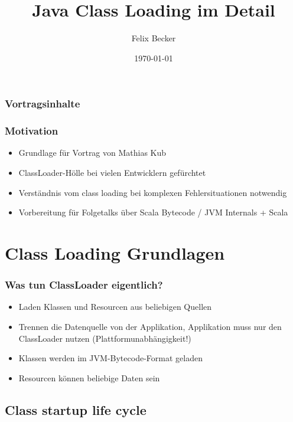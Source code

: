 \documentclass[aspectratio=169]{beamer}
\title{Java Class Loading im Detail}
\author{Felix Becker}
\date{\today}
\institute{Scala User Group Köln}
\begin{document}
\maketitle


\begin{frame}
	\frametitle{Vortragsinhalte}
	\tableofcontents
\end{frame}

\begin{frame}
	\frametitle{Motivation}
	\begin{itemize}
		\item{Grundlage für Vortrag von Mathias Kub}
		\item{ClassLoader-Hölle bei vielen Entwicklern gefürchtet}
		\item{Verständnis vom class loading bei komplexen Fehlersituationen notwendig}
		\item{Vorbereitung für Folgetalks über Scala Bytecode / JVM Internals + Scala}
	\end{itemize}
\end{frame}

\section{Class Loading Grundlagen}

\begin{frame}
	\frametitle{Was tun ClassLoader eigentlich?}
	\begin{itemize}
		\item{Laden Klassen und Resourcen aus beliebigen Quellen}
		\item{Trennen die Datenquelle von der Applikation, Applikation muss nur den ClassLoader nutzen (Plattformunabhängigkeit!)}
		\item{Klassen werden im JVM-Bytecode-Format geladen}
		\item{Resourcen können beliebige Daten sein}
	\end{itemize}
\end{frame}

\subsection{Class startup life cycle}
\end{document}
